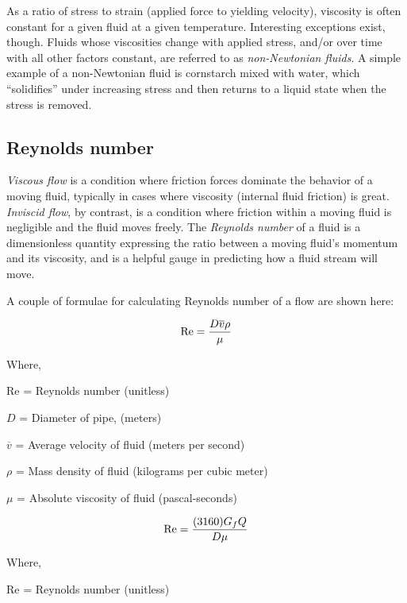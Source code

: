 As a ratio of stress to strain (applied force to yielding velocity), viscosity is often constant for a given fluid at a given temperature.  Interesting exceptions exist, though.  Fluids whose viscosities change with applied stress, and/or over time with all other factors constant, are referred to as \textit{non-Newtonian fluids}.  A simple example of a non-Newtonian fluid is cornstarch mixed with water, which ``solidifies'' under increasing stress and then returns to a liquid state when the stress is removed.  







\filbreak
\subsection{Reynolds number}

\textit{Viscous flow} is a condition where friction forces dominate the behavior of a moving fluid, typically in cases where viscosity (internal fluid friction) is great.  \textit{Inviscid flow}, by contrast, is a condition where friction within a moving fluid is negligible and the fluid moves freely.  The \textit{Reynolds number} of a fluid is a dimensionless quantity expressing the ratio between a moving fluid's momentum and its viscosity, and is a helpful gauge in predicting how a fluid stream will move.    

\label{Reynolds number}

A couple of formulae for calculating Reynolds number of a flow are shown here:

$$\hbox{Re} = {{D \overline{v} \rho} \over \mu}$$

\noindent
Where,

Re = Reynolds number (unitless)

$D$ = Diameter of pipe, (meters)

$\overline{v}$ = Average velocity of fluid (meters per second)

$\rho$ = Mass density of fluid (kilograms per cubic meter)

$\mu$ = Absolute viscosity of fluid (pascal-seconds)

\vskip 20pt

$$\hbox{Re} = {{(3160) G_f Q} \over {D \mu}}$$

\noindent
Where,

Re = Reynolds number (unitless)

